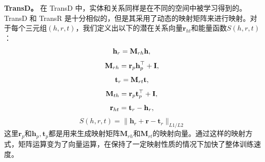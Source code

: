 \textbf{TransD。} 在 TransD 中，实体和关系同样是在不同的空间中被学习得到的。TransD 和 TransR 是十分相似的，但是其采用了动态的映射矩阵来进行映射。对于每个三元组$(h, r, t)$，我们定义出以下的潜在关系向量$\textbf{r}_{ht}$和能量函数$S(h,r,t)$：
\begin{equation}
\textbf{h}_{r} = \textbf{M}_{rh}\textbf{h}, \\\nonumber
\end{equation}
\begin{equation}
\textbf{M}_{rh} = \textbf{r}_p\textbf{h}_p^{\top}+\textbf{I}, \\\nonumber
\end{equation}
\begin{equation}
\textbf{t}_{r} = \textbf{M}_{rt}\textbf{t},  \\\nonumber
\end{equation}
\begin{equation}
\textbf{M}_{th} = \textbf{r}_p\textbf{t}_p^{\top}+\textbf{I}, \\\nonumber
\end{equation}
\begin{equation}
\textbf{r}_{ht} = \textbf{t}_r - \textbf{h}_r,  \\\nonumber
\end{equation}
\begin{equation}
S(h, r, t) = \lVert \textbf{h}_r + \textbf{r} - \textbf{t}_r \rVert_{L1/L2}
\end{equation}
这里$\textbf{r}_p$和$\textbf{h}_p, \textbf{t}_p$都是用来生成映射矩阵$\textbf{M}_{rh}$和$\textbf{M}_{rt}$的映射向量。通过这样的映射方式，矩阵运算变为了向量运算，在保持了一定映射性质的情况下加快了整体训练速度。


